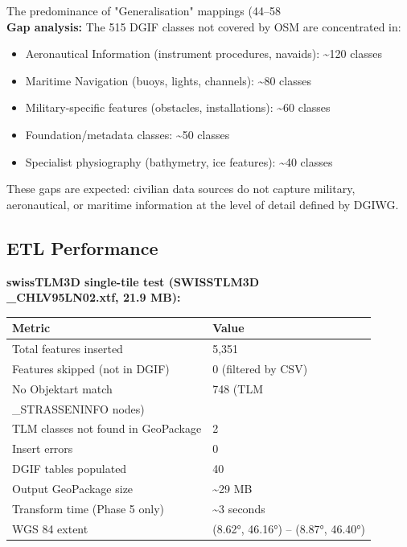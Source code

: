 \documentclass[conference]{IEEEtran}
\begin{document}
The predominance of "Generalisation" mappings (44–58\\%

\textbf{Gap analysis:} The 515 DGIF classes not covered by OSM are concentrated in:
\begin{itemize}[leftmargin=*]
\item Aeronautical Information (instrument procedures, navaids): \textasciitilde{}120 classes
\item Maritime Navigation (buoys, lights, channels): \textasciitilde{}80 classes
\item Military-specific features (obstacles, installations): \textasciitilde{}60 classes
\item Foundation/metadata classes: \textasciitilde{}50 classes
\item Specialist physiography (bathymetry, ice features): \textasciitilde{}40 classes
\end{itemize}

These gaps are expected: civilian data sources do not capture military, aeronautical, or maritime information at the level of detail defined by DGIWG.

\subsection{ETL Performance}

\textbf{swissTLM3D single-tile test (SWISSTLM3D\\_CHLV95LN02.xtf, 21.9 MB):}

\begin{center}
\begin{longtable}{p{}p{}}
Metric & Value \\
\midrule
Total features inserted & 5,351 \\
Features skipped (not in DGIF) & 0 (filtered by CSV) \\
No Objektart match & 748 (TLM\\_STRASSENINFO nodes) \\
TLM classes not found in GeoPackage & 2 \\
Insert errors & 0 \\
DGIF tables populated & 40 \\
Output GeoPackage size & \textasciitilde{}29 MB \\
Transform time (Phase 5 only) & \textasciitilde{}3 seconds \\
WGS 84 extent & (8.62°, 46.16°) – (8.87°, 46.40°) \\
\end{longtable}
\end{center}
\end{document}
